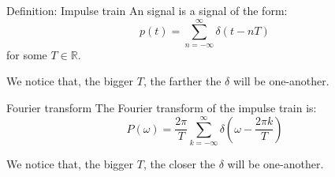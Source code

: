 \documentclass[a4paper]{article}
\begin{document}
\begin{parag}{Definition: Impulse train}
    An  signal is a signal of the form: 
    \[p\left(t\right) = \sum_{n=-\infty}^{\infty} \delta\left(t - nT\right)\]
    for some $T \in \mathbb{R}$.

    We notice that, the bigger $T$, the farther the $\delta$ will be one-another.

    \begin{subparag}{Fourier transform}
        The Fourier transform of the impulse train is: 
        \[P\left(\omega\right) = \frac{2\pi}{T} \sum_{k=-\infty}^{\infty} \delta\left(\omega - \frac{2\pi k}{T}\right)\]

        We notice that, the bigger $T$, the closer the $\delta$ will be one-another.
    \end{subparag}
\end{parag}
\end{document}
